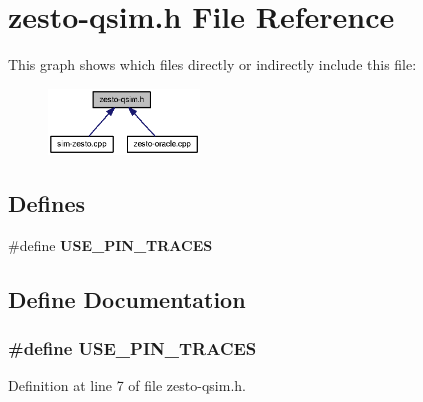 \section{zesto-qsim.h File Reference}
\label{zesto-qsim_8h}


This graph shows which files directly or indirectly include this file:\nopagebreak
\begin{figure}[H]
\begin{center}
\leavevmode
\includegraphics[width=114pt]{zesto-qsim_8h__dep__incl}
\end{center}
\end{figure}
\subsection*{Defines}
\begin{CompactItemize}
\item 
\#define {\bf USE\_\-PIN\_\-TRACES}
\end{CompactItemize}


\subsection{Define Documentation}
\subsubsection[{USE\_\-PIN\_\-TRACES}]{\setlength{\rightskip}{0pt plus 5cm}\#define USE\_\-PIN\_\-TRACES}\label{zesto-qsim_8h_3ad9043475baaed1a4a792d3b563c60d}




Definition at line 7 of file zesto-qsim.h.